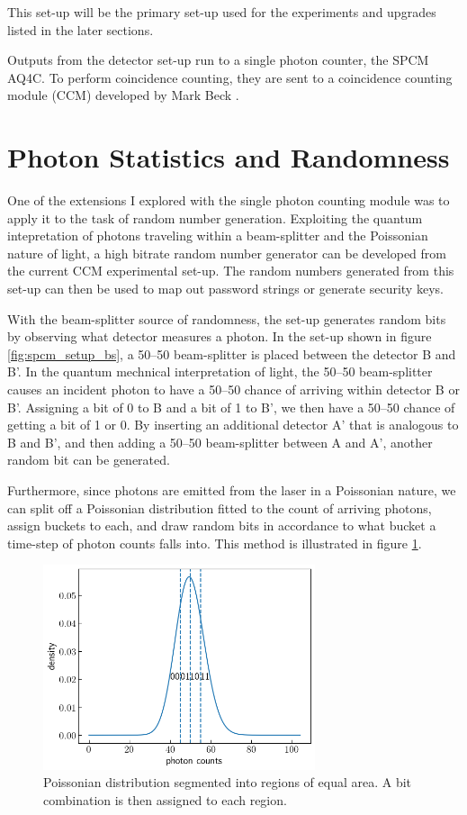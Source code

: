 \documentclass[letterpaper, 11 pt]{article}
\begin{document}
This set-up will be the primary set-up used for the experiments and upgrades
listed in the later sections. 

Outputs from the detector set-up run to a single photon counter, the SPCM AQ4C.
To perform coincidence counting, they are sent to a coincidence counting module (CCM)
developed by Mark Beck \cite{beck_ccm}.

\section{Photon Statistics and Randomness}

One of the extensions I explored with the single photon counting module was to
apply it to the task of random number generation. Exploiting the quantum
intepretation of photons traveling within a beam-splitter and the Poissonian
nature of light, a high bitrate random number generator can be developed from
the current CCM experimental set-up. The random numbers generated from this
set-up can then be used to map out password strings or generate security keys.

With the beam-splitter source of randomness, the set-up generates random bits by
observing what detector measures a photon. In the set-up shown in figure
\ref{fig:spcm_setup_bs}, a 50--50 beam-splitter is placed between the detector B
and B'. In the quantum mechnical interpretation of light, the 50--50
beam-splitter causes an incident photon to have a 50--50 chance of arriving
within detector B or B'. Assigning a bit of 0 to B and a bit of 1 to B', we then
have a 50--50 chance of getting a bit of 1 or 0. By inserting an additional
detector A' that is analogous to B and B', and then adding a 50--50
beam-splitter between A and A', another random bit can be generated. 

Furthermore, since photons are emitted from the laser in a Poissonian nature, we
can split off a Poissonian distribution fitted to the count of arriving photons,
assign buckets to each, and draw random bits in accordance to what bucket a
time-step of photon counts falls into. This method is illustrated in figure
\ref{fig:poisson}.
\begin{figure}[H]
    \centering
    \includegraphics[width = 8cm]{poisson_cut.png}
    \caption{Poissonian distribution segmented into regions of equal area. A bit combination is then assigned to each region.}
    \label{fig:poisson}
\end{figure}
\end{document}
